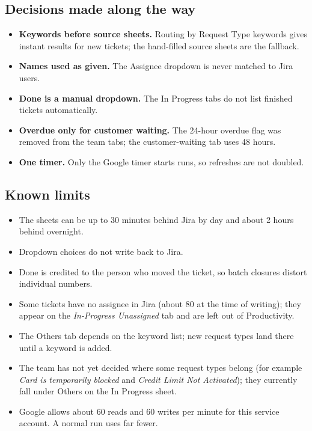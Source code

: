 \documentclass[11pt,a4paper]{article}
\let\oldsubsection\subsection
\renewcommand{\subsection}{\needspace{7\baselineskip}\oldsubsection}
\begin{document}
\subsection{Decisions made along the way}
\begin{itemize}
  \item \textbf{Keywords before source sheets.} Routing by Request Type keywords gives instant results for new
    tickets; the hand-filled source sheets are the fallback.
  \item \textbf{Names used as given.} The Assignee dropdown is never matched to Jira users.
  \item \textbf{Done is a manual dropdown.} The In Progress tabs do not list finished tickets automatically.
  \item \textbf{Overdue only for customer waiting.} The 24-hour overdue flag was removed from the team tabs; the
    customer-waiting tab uses 48 hours.
  \item \textbf{One timer.} Only the Google timer starts runs, so refreshes are not doubled.
\end{itemize}

\subsection{Known limits}
\begin{itemize}
  \item The sheets can be up to 30 minutes behind Jira by day and about 2 hours behind overnight.
  \item Dropdown choices do not write back to Jira.
  \item Done is credited to the person who moved the ticket, so batch closures distort individual numbers.
  \item Some tickets have no assignee in Jira (about 80 at the time of writing); they appear on the \emph{In-Progress Unassigned} tab and are left out of
    Productivity.
  \item The Others tab depends on the keyword list; new request types land there until a keyword is added.
  \item The team has not yet decided where some request types belong (for example \emph{Card is temporarily blocked}
    and \emph{Credit Limit Not Activated}); they currently fall under Others on the In Progress sheet.
  \item Google allows about 60 reads and 60 writes per minute for this service account. A normal run uses far fewer.
\end{itemize}
\end{document}
